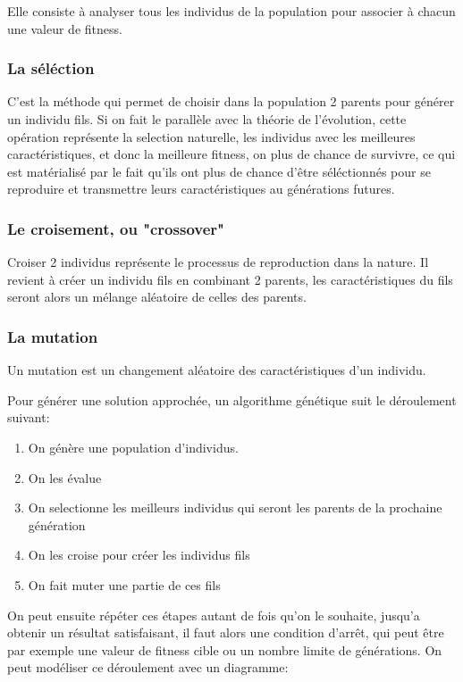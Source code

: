 \documentclass[11pt]{article}
\begin{document}
Elle consiste à analyser tous les individus de la population pour associer à chacun une valeur de fitness.

\subsubsection{La séléction}
\label{sec-1-2-5}

C'est la méthode qui permet de choisir dans la population 2 parents pour générer un individu fils.
Si on fait le parallèle avec la théorie de l'évolution, cette opération représente la selection naturelle,
les individus avec les meilleures caractéristiques, et donc la meilleure fitness, on plus de chance de survivre,
ce qui est matérialisé par le fait qu'ils ont plus de chance d'être séléctionnés pour se reproduire et transmettre
leurs caractéristiques au générations futures.

\subsubsection{Le croisement, ou "crossover"}
\label{sec-1-2-6}

Croiser 2 individus représente le processus de reproduction dans la nature. Il revient à créer un individu fils
en combinant 2 parents, les caractéristiques du fils seront alors un mélange aléatoire de celles des parents.

\subsubsection{La mutation}
\label{sec-1-2-7}

Un mutation est un changement aléatoire des caractéristiques d'un individu. 

Pour générer une solution approchée, un algorithme génétique suit le déroulement suivant:

\begin{enumerate}
\item On génère une population d'individus.
\item On les évalue
\item On selectionne les meilleurs individus qui seront les parents de la prochaine génération
\item On les croise pour créer les individus fils
\item On fait muter une partie de ces fils
\end{enumerate}

On peut ensuite répéter ces étapes autant de fois qu'on le souhaite, jusqu'a obtenir un résultat satisfaisant,
il faut alors une condition d'arrêt, qui peut être par exemple une valeur de fitness cible ou un nombre limite de générations.
On peut modéliser ce déroulement avec un diagramme:
\end{document}
